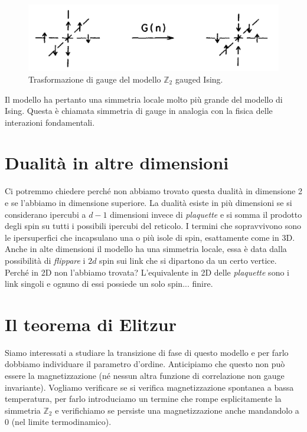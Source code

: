 \documentclass[12pt,a4paper]{article}
\begin{document}
\begin{figure}[!htb]
\centering
\includegraphics[scale=0.20]{gauge.png}
\caption{Trasformazione di gauge del modello $\mathbb{Z}_2$ gauged Ising.\label{fig:gauge}}
\end{figure}

Il modello ha pertanto una simmetria locale molto più grande del modello di Ising. Questa è chiamata simmetria di gauge in analogia con la fisica delle interazioni fondamentali.

\section{Dualità in altre dimensioni}
Ci potremmo chiedere perché non abbiamo trovato questa dualità in dimensione 2 e se l'abbiamo in dimensione superiore. La dualità esiste in più dimensioni se si considerano ipercubi a $d-1$ dimensioni invece di \emph{plaquette} e si somma il prodotto degli spin su tutti i possibili ipercubi del reticolo. I termini che sopravvivono sono le ipersuperfici che incapsulano una o più isole di spin, esattamente come in 3D. Anche in alte dimensioni il modello ha una simmetria locale, essa è data dalla possibilità di \emph{flippare} i $2d$ spin sui link che si dipartono da un certo vertice. Perché in 2D non l'abbiamo trovata? L'equivalente in 2D delle \emph{plaquette} sono i link singoli e ognuno di essi possiede un solo spin... finire.

\section{Il teorema di Elitzur}
Siamo interessati a studiare la transizione di fase di questo modello e per farlo dobbiamo individuare il parametro d'ordine. Anticipiamo che questo non può essere la magnetizzazione (né nessun altra funzione di correlazione non gauge invariante).
Vogliamo verificare se si verifica magnetizzazione spontanea a bassa temperatura, per farlo introduciamo un termine che rompe esplicitamente la simmetria $\mathbb{Z}_2$ e verifichiamo se persiste una magnetizzazione anche mandandolo a 0 (nel limite termodinamico).
\end{document}
